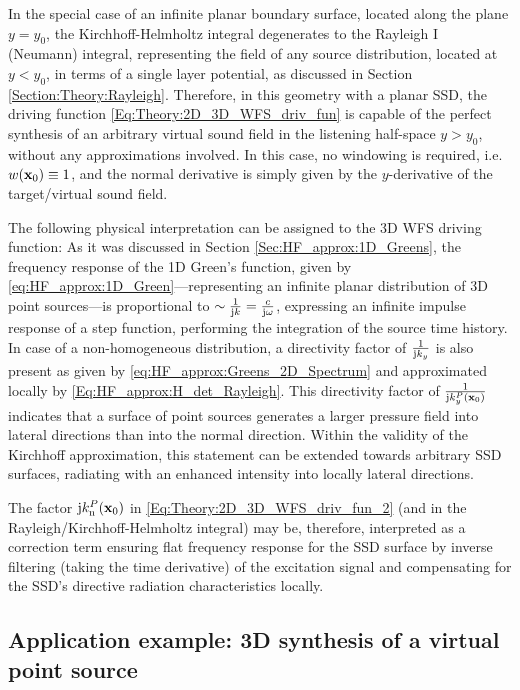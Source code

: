 In the special case of an infinite planar boundary surface, located along the plane $y = y_0$, the Kirchhoff-Helmholtz integral degenerates to the Rayleigh I (Neumann) integral, representing the field of any source distribution, located at $y<y_0$, in terms of a single layer potential, as discussed in Section \ref{Section:Theory:Rayleigh}.
Therefore, in this geometry with a planar SSD, the driving function \eqref{Eq:Theory:2D_3D_WFS_driv_fun} is capable of the perfect synthesis of an arbitrary virtual sound field in the listening half-space $y>y_0$, without any approximations involved.
In this case, no windowing is required, i.e. $w(\mathbf{x}_0) \equiv 1$, and the normal derivative is simply given by the $y$-derivative of the target/virtual sound field.

\vspace{3mm}
The following physical interpretation can be assigned to the 3D WFS driving function:
As it was discussed in Section \ref{Sec:HF_approx:1D_Greens}, the frequency response of the 1D Green's function, given by \eqref{eq:HF_approx:1D_Green}---representing an infinite planar distribution of 3D point sources---is proportional to $\sim \frac{1}{\mathrm{j} k} = \frac{c}{\mathrm{j} \omega}$, expressing an infinite impulse response of a step function, performing the integration of the source time history. 
In case of a non-homogeneous distribution, a directivity factor of $\frac{1}{\mathrm{j} k_y}$ is also present as given by \eqref{eq:HF_approx:Greens_2D_Spectrum} and approximated locally by \eqref{Eq:HF_approx:H_det_Rayleigh}.
This directivity factor of $\frac{1}{\mathrm{j} k^P_y(\mathbf{x}_0)}$ indicates that a surface of point sources generates a larger pressure field into lateral directions than into the normal direction.
Within the validity of the Kirchhoff approximation, this statement can be extended towards arbitrary SSD surfaces, radiating with an enhanced intensity into locally lateral directions.

The factor $\mathrm{j} k_{\mathrm{n}}^P(\mathbf{x}_0)$ in \eqref{Eq:Theory:2D_3D_WFS_driv_fun_2} (and in the Rayleigh/Kirchhoff-Helmholtz integral) may be, therefore, interpreted as a correction term ensuring flat frequency response for the SSD surface by inverse filtering (taking the time derivative) of the excitation signal and compensating for the SSD's directive radiation characteristics locally.

\subsection*{Application example: 3D synthesis of a virtual point source}

